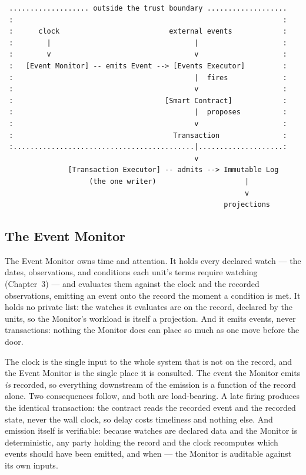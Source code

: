 \documentclass[11pt,a4paper]{article}
\begin{document}
{\small
\begin{verbatim}
 ................... outside the trust boundary ...................
 :                                                                :
 :      clock                          external events            :
 :        |                                  |                    :
 :        v                                  v                    :
 :   [Event Monitor] -- emits Event --> [Events Executor]         :
 :                                           |  fires             :
 :                                           v                    :
 :                                    [Smart Contract]            :
 :                                           |  proposes          :
 :                                           v                    :
 :                                      Transaction               :
 :...........................................|....................:
                                             v
               [Transaction Executor] -- admits --> Immutable Log
                    (the one writer)                     |
                                                         v
                                                    projections
\end{verbatim}
}

\subsection{The Event Monitor}

The Event Monitor owns time and attention. It holds every declared watch ---
the dates, observations, and conditions each unit's terms require watching
(Chapter~3) --- and evaluates them against the clock and the recorded
observations, emitting an event onto the record the moment a condition is met.
It holds no private list: the watches it evaluates are on the record, declared
by the units, so the Monitor's workload is itself a projection. And it emits
events, never transactions: nothing the Monitor does can place so much as one
move before the door.

The clock is the single input to the whole system that is not on the record,
and the Event Monitor is the single place it is consulted. The event the
Monitor emits \emph{is} recorded, so everything downstream of the emission is a
function of the record alone. Two consequences follow, and both are
load-bearing. A late firing produces the identical transaction: the contract
reads the recorded event and the recorded state, never the wall clock, so delay
costs timeliness and nothing else. And emission itself is verifiable: because
watches are declared data and the Monitor is deterministic, any party holding
the record and the clock recomputes which events should have been emitted, and
when --- the Monitor is auditable against its own inputs.
\end{document}
